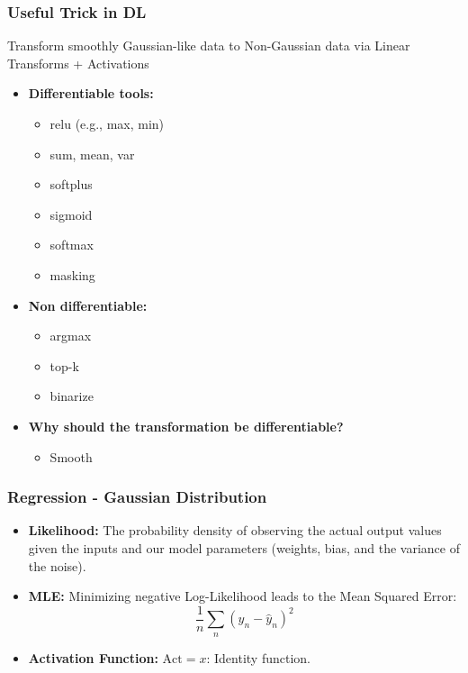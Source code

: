 \subsubsection{Useful Trick in DL}
\begin{notes}
    Transform smoothly Gaussian-like data to Non-Gaussian data via Linear Transforms + Activations

    \begin{itemize}
        \item \textbf{Differentiable tools:}
        \begin{itemize}
            \item relu (e.g., max, min)
            \item sum, mean, var
            \item softplus
            \item sigmoid
            \item softmax
            \item masking
        \end{itemize}
    
        \item \textbf{Non differentiable:}
        \begin{itemize}
            \item argmax
            \item top-k
            \item binarize
        \end{itemize}
    \end{itemize}
\end{notes}

\begin{example}
    \begin{itemize}
        \item \textbf{Why should the transformation be differentiable?} 
        \begin{itemize}
            \item Smooth
        \end{itemize}
    \end{itemize}    
\end{example}

\subsubsection{Regression - Gaussian Distribution}
\begin{notes}
    \begin{itemize}
        \item \textbf{Likelihood:} The probability density of observing the actual output values given the inputs and our model parameters (weights, bias, and the variance of the noise).
        \item \textbf{MLE:} Minimizing negative Log-Likelihood leads to the Mean Squared Error:
        \[
        \frac{1}{n} \sum_n (y_n - \hat{y}_n)^2
        \]
        \item \textbf{Activation Function:} $\text{Act} = x$: Identity function.
    \end{itemize}
\end{notes}

